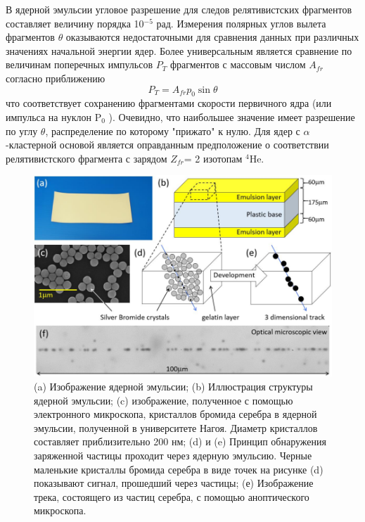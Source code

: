 \documentclass[fontsize=14pt]{scrreport}
\begin{document}
В ядерной эмульсии угловое разрешение для следов релятивистских фрагментов составляет величину порядка 10$^{-5}$ рад. Измерения полярных углов вылета фрагментов $\theta$ оказываются недостаточными для сравнения данных при различных значениях начальной энергии ядер. Более универсальным является сравнение по величинам поперечных импульсов $P_{T}$ фрагментов с массовым числом $A_{fr}$ согласно приближению
\begin{equation}
    P_{T}=A_{fr}p_{0}\sin\theta
    \label{2}
\end{equation}
что соответствует сохранению фрагментами скорости первичного ядра (или импульса на нуклон P$_{0}$ ). Очевидно, что наибольшее значение имеет разрешение по углу $\theta$, распределение по которому "прижато" к нулю. Для ядер с $\alpha$-кластерной основой является оправданным предположение о соответствии релятивистского фрагмента с зарядом $Z_{fr}$= 2 изотопам $^{4}$He.


\begin{figure}[!ht]
\centerline{\includegraphics[scale=.4]{Figure1-1.png}}
\label{figure1-1}
\caption{(a) Изображение ядерной эмульсии; (b) Иллюстрация структуры ядерной эмульсии; (c) изображение, полученное с помощью электронного микроскопа, кристаллов бромида серебра в ядерной эмульсии, полученной в университете Нагоя. Диаметр кристаллов составляет приблизительно 200 нм; (d) и (e) Принцип обнаружения заряженной частицы проходит через ядерную эмульсию. Черные маленькие кристаллы бромида серебра в виде точек на рисунке (d) показывают сигнал, прошедший через частицы; (е) Изображение трека, состоящего из частиц серебра, с помощью аноптического микроскопа.}
\end{figure}
\end{document}
